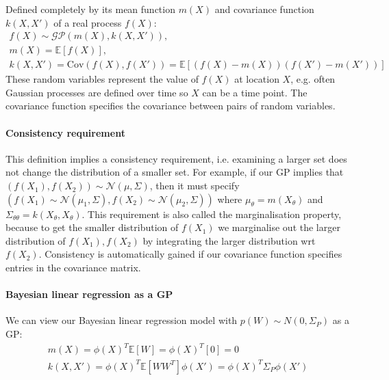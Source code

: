 \documentclass[10pt]{article}
\begin{document}
Defined completely by its mean function $m(X)$ and covariance function $k(X,X')$ of a real process $f(X)$:
\begin{equation*}
    \begin{aligned}
        f(X) \sim \mathcal{GP}(m(X), k(X,X')), \\
        m(X) = \mathbb{E}[f(X)], \\
        k(X,X') = \text{Cov}(f(X), f(X')) = \mathbb{E}[(f(X) - m(X))(f(X') - m(X'))]
    \end{aligned}
\end{equation*}
These random variables represent the value of $f(X)$ at location $X$, e.g. often Gaussian processes are defined over time so $X$ can be a time point. The covariance function specifies the covariance between pairs of random variables.

\paragraph{Consistency requirement}
This definition implies a consistency requirement, i.e. examining a larger set does not change the distribution of a smaller set. For example, if our GP implies that $(f(X_1), f(X_2)) \sim \mathcal{N}(\mu, \Sigma)$, then it must specify $(f(X_1) \sim \mathcal{N}(\mu_1, \Sigma), f(X_2) \sim \mathcal{N}(\mu_2, \Sigma))$ where $\mu_{\theta} = m(X_{\theta})$ and $\Sigma_{\theta\theta} = k(X_{\theta}, X_{\theta})$. This requirement is also called the marginalisation property, because to get the smaller distribution of $f(X_1)$ we marginalise out the larger distribution of $f(X_1), f(X_2)$ by integrating the larger distribution wrt $f(X_2)$. Consistency is automatically gained if our covariance function specifies entries in the covariance matrix.
        
\paragraph{Bayesian linear regression as a GP}
We can view our Bayesian linear regression model with $p(W) \sim N(0, \Sigma_P)$ as a GP:
\begin{equation*}
    \begin{aligned}
        m(X) = \phi(X)^T\mathbb{E}[W] = \phi(X)^T[0] = 0 \\
        k(X,X') = \phi(X)^T\mathbb{E}[WW^T]\phi(X') = \phi(X)^T\Sigma_P\phi(X')
    \end{aligned}
\end{equation*}
\end{document}
